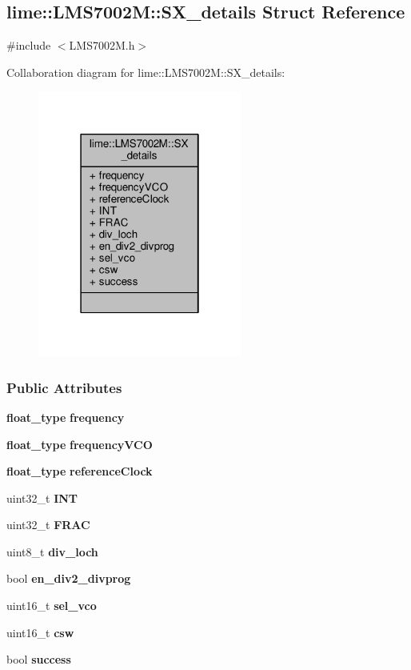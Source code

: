 \subsection{lime\+:\+:L\+M\+S7002M\+:\+:S\+X\+\_\+details Struct Reference}
\label{structlime_1_1LMS7002M_1_1SX__details}


{\ttfamily \#include $<$L\+M\+S7002\+M.\+h$>$}



Collaboration diagram for lime\+:\+:L\+M\+S7002M\+:\+:S\+X\+\_\+details\+:
\nopagebreak
\begin{figure}[H]
\begin{center}
\leavevmode
\includegraphics[width=190pt]{d5/dfa/structlime_1_1LMS7002M_1_1SX__details__coll__graph}
\end{center}
\end{figure}
\subsubsection*{Public Attributes}
\begin{DoxyCompactItemize}
\item 
{\bf float\+\_\+type} {\bf frequency}
\item 
{\bf float\+\_\+type} {\bf frequency\+V\+CO}
\item 
{\bf float\+\_\+type} {\bf reference\+Clock}
\item 
uint32\+\_\+t {\bf I\+NT}
\item 
uint32\+\_\+t {\bf F\+R\+AC}
\item 
uint8\+\_\+t {\bf div\+\_\+loch}
\item 
bool {\bf en\+\_\+div2\+\_\+divprog}
\item 
uint16\+\_\+t {\bf sel\+\_\+vco}
\item 
uint16\+\_\+t {\bf csw}
\item 
bool {\bf success}
\end{DoxyCompactItemize}


